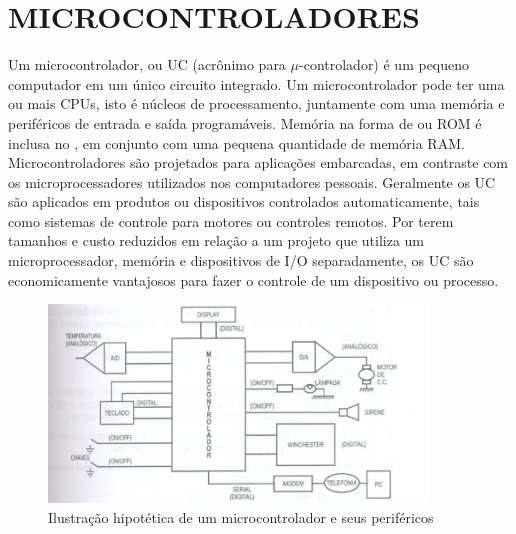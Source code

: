 \section{MICROCONTROLADORES}
\label{sec:micro}

Um microcontrolador, ou UC (acrônimo para   $\mu$-controlador) é um pequeno computador em um único circuito integrado. Um microcontrolador pode ter uma ou mais CPUs, isto é núcleos de processamento, juntamente com uma memória e periféricos de entrada e saída programáveis. Memória na forma de  ou ROM é inclusa no , em conjunto com uma pequena quantidade de memória RAM. Microcontroladores são projetados para aplicações embarcadas, em contraste com os microprocessadores utilizados nos computadores pessoais. Geralmente os UC são aplicados em produtos ou dispositivos controlados automaticamente, tais como sistemas de controle para motores ou controles remotos. Por terem tamanhos e custo reduzidos em relação a um projeto que utiliza um microprocessador, memória e dispositivos de I/O separadamente, os UC são economicamente vantajosos para fazer o controle de um dispositivo ou processo.

\pagebreak 

\begin{figure}[t]
    \centering
    \includegraphics[width=0.9\textwidth]{./dados/figuras/micro}
    \caption{Ilustração hipotética de um microcontrolador e seus periféricos}
    \label{fig:figura-mvc}
\end{figure}

\null
\vfill


            
